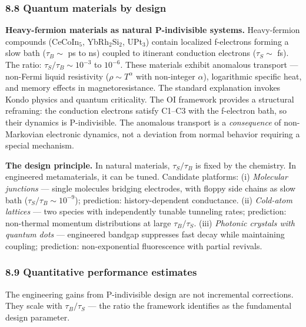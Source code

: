 \documentclass[
]{article}
\begin{document}
\hypertarget{quantum-materials-by-design}{%
\subsubsection{8.8 Quantum materials by
design}\label{quantum-materials-by-design}}

\textbf{Heavy-fermion materials as natural P-indivisible systems.}
Heavy-fermion compounds (CeCoIn\(_5\), YbRh\(_2\)Si\(_2\), UPt\(_3\))
contain localized f-electrons forming a slow bath (\(\tau_B \sim\) ps to
ns) coupled to itinerant conduction electrons (\(\tau_S \sim\) fs). The
ratio: \(\tau_S / \tau_B \sim 10^{-3}\) to \(10^{-6}\). These materials
exhibit anomalous transport --- non-Fermi liquid resistivity
(\(\rho \sim T^\alpha\) with non-integer \(\alpha\)), logarithmic
specific heat, and memory effects in magnetoresistance. The standard
explanation invokes Kondo physics and quantum criticality. The OI
framework provides a structural reframing: the conduction electrons
satisfy C1--C3 with the f-electron bath, so their dynamics is
P-indivisible. The anomalous transport is a \emph{consequence} of
non-Markovian electronic dynamics, not a deviation from normal behavior
requiring a special mechanism.

\textbf{The design principle.} In natural materials, \(\tau_S / \tau_B\)
is fixed by the chemistry. In engineered metamaterials, it can be tuned.
Candidate platforms: (i) \emph{Molecular junctions} --- single molecules
bridging electrodes, with floppy side chains as slow bath
(\(\tau_S / \tau_B \sim 10^{-9}\)); prediction: history-dependent
conductance. (ii) \emph{Cold-atom lattices} --- two species with
independently tunable tunneling rates; prediction: non-thermal momentum
distributions at large \(\tau_B / \tau_S\). (iii) \emph{Photonic
crystals with quantum dots} --- engineered bandgap suppresses fast decay
while maintaining coupling; prediction: non-exponential fluorescence
with partial revivals.

\hypertarget{quantitative-performance-estimates}{%
\subsubsection{8.9 Quantitative performance
estimates}\label{quantitative-performance-estimates}}

The engineering gains from P-indivisible design are not incremental
corrections. They scale with \(\tau_B / \tau_S\) --- the ratio the
framework identifies as the fundamental design parameter.
\end{document}
